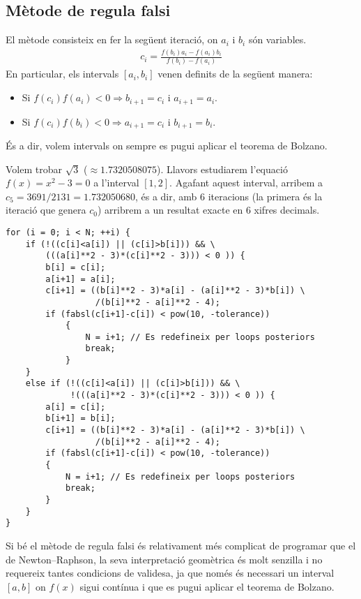 \subsection{Mètode de regula falsi}
El mètode consisteix en fer la següent iteració, on $a_{i}$ i $b_{i}$ són variables.
\begin{align}
    c_{i} = \frac{f(b_{i})a_{i} - f(a_{i})b_{i}}{f(b_{i}) - f(a_{i})}
\end{align}
En particular, els intervals $[a_{i}, b_{i}]$ venen definits de la següent manera:
\begin{itemize}
    \item Si $f(c_{i}) f(a_{i}) < 0 \Rightarrow b_{i+1} = c_{i}$ i $a_{i+1} = a_{i}$.
    \item Si $f(c_{i}) f(b_{i}) < 0 \Rightarrow a_{i+1} = c_{i}$ i $b_{i+1} = b_{i}$.
\end{itemize}
És a dir, volem intervals on sempre es pugui aplicar el teorema de Bolzano.

\begin{example}\label{ex:regula}
    Volem trobar $\sqrt{3}$ ($\approx \num{1.7320508075}$). Llavors estudiarem l'equació $f(x) = x^{2} - 3 = 0$ a l'interval $[1,2]$. Agafant aquest interval, arribem a $c_{5} = 3691/2131 = \num{1.732050680}$, és a dir, amb 6 iteracions (la primera és la iteració que genera $c_{0}$) arribrem a un resultat exacte en 6 xifres decimals.

\begin{Verbatim}
for (i = 0; i < N; ++i) {
	if (!((c[i]<a[i]) || (c[i]>b[i])) && \ 
	    (((a[i]**2 - 3)*(c[i]**2 - 3))) < 0 )) {
		b[i] = c[i];
		a[i+1] = a[i];
		c[i+1] = ((b[i]**2 - 3)*a[i] - (a[i]**2 - 3)*b[i]) \
		          /(b[i]**2 - a[i]**2 - 4);
		if (fabsl(c[i+1]-c[i]) < pow(10, -tolerance))
			{
				N = i+1; // Es redefineix per loops posteriors
				break;
			}
	}
	else if (!((c[i]<a[i]) || (c[i]>b[i])) && \
	         !(((a[i]**2 - 3)*(c[i]**2 - 3))) < 0 )) {
		a[i] = c[i];
		b[i+1] = b[i];
		c[i+1] = ((b[i]**2 - 3)*a[i] - (a[i]**2 - 3)*b[i]) \
		          /(b[i]**2 - a[i]**2 - 4);
		if (fabsl(c[i+1]-c[i]) < pow(10, -tolerance))
		{
			N = i+1; // Es redefineix per loops posteriors
			break;
		}
	}
}
\end{Verbatim}
\end{example}
Si bé el mètode de regula falsi és relativament més complicat de programar que el de Newton--Raphson, la seva interpretació geomètrica és molt senzilla i no requereix tantes condicions de validesa, ja que només és necessari un interval $[a,b]$ on $f(x)$ sigui contínua i que es pugui aplicar el teorema de Bolzano.

